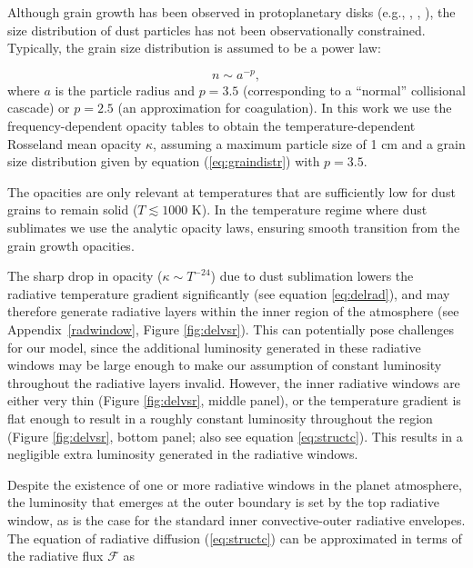 \documentclass[apj]{emulateapj}
\newcommand{\App}[1]{Appendix~\ref{#1}}
\begin{document}
Although grain growth has been observed in protoplanetary disks (e.g., \citealt{beckwith90}, \citealt{beckwith91}, \citealt{perez12}), the size distribution of dust particles has not been observationally constrained. Typically, the grain size distribution is assumed to be a power law: 

\begin{equation}
\label{eq:graindistr}
n \sim a^{-p},
\end{equation}
where $a$ is the particle radius and $p=3.5$ (corresponding to a ``normal'' collisional cascade) or $p=2.5$ (an approximation for coagulation). In this work we use the  \citet{dalessio01} frequency-dependent opacity tables to obtain the temperature-dependent Rosseland mean opacity $\kappa$,  assuming a maximum particle size of 1 cm and a grain size distribution given by equation (\ref{eq:graindistr}) with $p=3.5$.

The \citet{dalessio01} opacities are only relevant at temperatures that are sufficiently low for dust grains to remain solid ($T \lesssim 1000$ K). In the temperature regime where dust sublimates we use the \citet{bell94} analytic opacity laws, ensuring smooth transition from the grain growth opacities. 

The sharp drop in opacity ($\kappa \sim T^{-24}$) due to dust sublimation lowers the radiative temperature gradient significantly (see equation \ref{eq:delrad}), and may therefore generate radiative layers within the inner region of the atmosphere (see \App{radwindow}, Figure \ref{fig:delvsr}). This can potentially pose challenges for our model, since the additional luminosity generated in these radiative windows may be large enough to make our assumption of constant luminosity throughout the radiative layers invalid. However, the inner radiative windows are either very thin (Figure \ref{fig:delvsr}, middle panel), or the temperature gradient is flat enough to result in a roughly constant luminosity throughout the region (Figure \ref{fig:delvsr}, bottom panel; also see equation \ref{eq:structc}). This results in a negligible extra luminosity generated in the radiative windows. %

Despite the existence of one or more radiative windows in the planet atmosphere, the luminosity that emerges at the outer boundary is set by the top radiative window, as is the case for the standard inner convective-outer radiative envelopes. The equation of radiative diffusion (\ref{eq:structc}) can be approximated in terms of the radiative flux $\mathcal{F}$ as 
\end{document}
